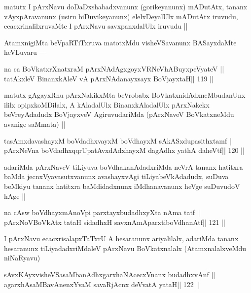 \begin{artha}
matutx I pArxNavu doDaDxshabadxvanunx (gorikeyanunx) mADutAtx, tananx 
vAyxpAravanunx (usiru biDuvikeyanunx) elelxDeyalUlx mADutAtx iruvudu, ecacxrinalilxruvaMte I pArxNavu savxpanxdalUlx iruvudu ||
\end{artha}

\begin{artha}
AtamxnigiMta beVpaRTiTxruva matotxMdu visheVSavanunx BASayxdaMte heVLuvaru ---
\end{artha}

\begin{shl}
na ca BoVkatxrXnatxraM pArxNAdAgxgoyxVRNeVhABuyxpeVyateV ||
tatAkxleV BinanxkAleV vA pArxNAdanayxsayx BoVjayxtaH\hfill || 119 ||
\end{shl}

\begin{artha}
matutx gAgayxRnu pArxNakikxMta beVrobabx BoVkatxnidAdxneMbudanUnx ililx 
opipxkoMDilalx, A kAladalUlx BinanxkAladalUlx pArxNakekx beVreyAdadudx BoVjayxveV AgiruvudariMda (pArxNaveV BoVkatxneMdu avanige saMmata) ||
\end{artha}

\begin{shl}
tasAmxdavashayxM boVdadhxvayxM boVdhayxM sAkASxdupasithxtamf ||
pArxNeVna boVdadhxqqrUpatAvxdAdxhayxM dagAdhx yathA daheVtf\hfill || 120 ||
\end{shl}

\begin{artha}
adariMda pArxNaveV tiLiyuva boVdhakanAdadxriMda neVrA tananx hatitxra 
baMda jecnxVyavasutxvanunx avashayxvAgi tiLiyabeVkAdadudx, suDuva beMkiyu tananx hatitxra baMdidadxnunx iMdhanavanunx heVge suDuvudoV hAge ||
\end{artha}

\begin{shl}
na cAsw boVdhayxmAnoV\s pi parxtayxbudadhxyXta nAma tatf ||
pArxNoV\s BoVkAtx tataH sidadhxH savxnAmAparxtiboVdhanAtf\hfill || 121 ||
\end{shl}

\begin{artha}
I pArxNavu ecacxrisalapxTaTxrU A hesaranunx ariyalilalx, adariMda tananx hesaranunx tiLiyadadxriMdaleV pArxNavu BoVkatxnalalx (AtamxnalalxveMdu niNaRyavu)
\end{artha}

\begin{shl}
sAvxKAyxvisheVSasaMbanAdhxgarxhaNAcecxVnanx budadhxvAnf ||
agarxhAsaMBavAnenxYvaM savaRjAcnx deVvatA yataH\hfill || 122 ||
\end{shl}


